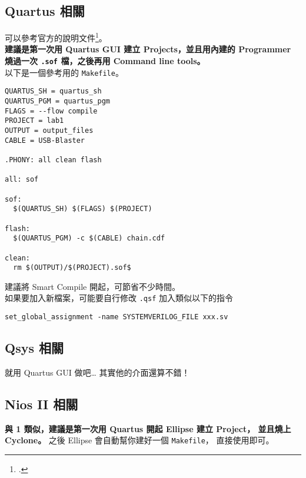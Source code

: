 \documentclass[12pt, a4paper]{article}
\def\codesize{\fontsize{10}{15}\selectfont}
\begin{document}
\subsection{Quartus 相關}
可以參考官方的說明文件\footcite{QuartusCmdRef}。\\
{\bf 建議是第一次用 Quartus GUI 建立 Projects，並且用內建的
Programmer 燒過一次 \texttt{.sof} 檔，之後再用 Command line tools。} \\
以下是一個參考用的 \texttt{Makefile}。
\begin{verbatim}
QUARTUS_SH = quartus_sh
QUARTUS_PGM = quartus_pgm
FLAGS = --flow compile
PROJECT = lab1
OUTPUT = output_files
CABLE = USB-Blaster

.PHONY: all clean flash

all: sof

sof:
  $(QUARTUS_SH) $(FLAGS) $(PROJECT)

flash:
  $(QUARTUS_PGM) -c $(CABLE) chain.cdf

clean:
  rm $(OUTPUT)/$(PROJECT).sof$
\end{verbatim}
建議將 Smart Compile 開起，可節省不少時間。 \\
如果要加入新檔案，可能要自行修改 \texttt{.qsf} 加入類似以下的指令
\begin{verbatim}
set_global_assignment -name SYSTEMVERILOG_FILE xxx.sv
\end{verbatim}
\subsection{Qsys 相關}
就用 Quartus GUI 做吧… 其實他的介面還算不錯！
\subsection{Nios II 相關}
{\bf 與 1 類似，建議是第一次用 Quartus 開起 Ellipse 建立 Project，
並且燒上 Cyclone。 } 之後 Ellipse 會自動幫你建好一個 \texttt{Makefile}，
直接使用即可。
\end{document}
